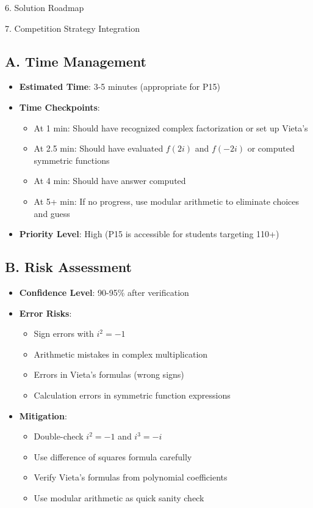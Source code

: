 \documentclass[12pt]{article}
\begin{document}
\begin{roadmapbox}{6. Solution Roadmap}
\end{roadmapbox}

\begin{competitionbox}{7. Competition Strategy Integration}

\subsection*{A. Time Management}
\begin{itemize}[leftmargin=*]
    \item \textbf{Estimated Time}: 3-5 minutes (appropriate for P15)
    \item \textbf{Time Checkpoints}:
    \begin{itemize}
        \item At 1 min: Should have recognized complex factorization or set up Vieta's
        \item At 2.5 min: Should have evaluated $f(2i)$ and $f(-2i)$ or computed symmetric functions
        \item At 4 min: Should have answer computed
        \item At 5+ min: If no progress, use modular arithmetic to eliminate choices and guess
    \end{itemize}
    \item \textbf{Priority Level}: High (P15 is accessible for students targeting 110+)
\end{itemize}

\subsection*{B. Risk Assessment}
\begin{itemize}[leftmargin=*]
    \item \textbf{Confidence Level}: 90-95\% after verification
    
    \item \textbf{Error Risks}: 
    \begin{itemize}
        \item Sign errors with $i^2 = -1$
        \item Arithmetic mistakes in complex multiplication
        \item Errors in Vieta's formulas (wrong signs)
        \item Calculation errors in symmetric function expressions
    \end{itemize}
    
    \item \textbf{Mitigation}:
    \begin{itemize}
        \item Double-check $i^2 = -1$ and $i^3 = -i$
        \item Use difference of squares formula carefully
        \item Verify Vieta's formulas from polynomial coefficients
        \item Use modular arithmetic as quick sanity check
    \end{itemize}
    

\end{itemize}
\end{competitionbox}
\end{document}
